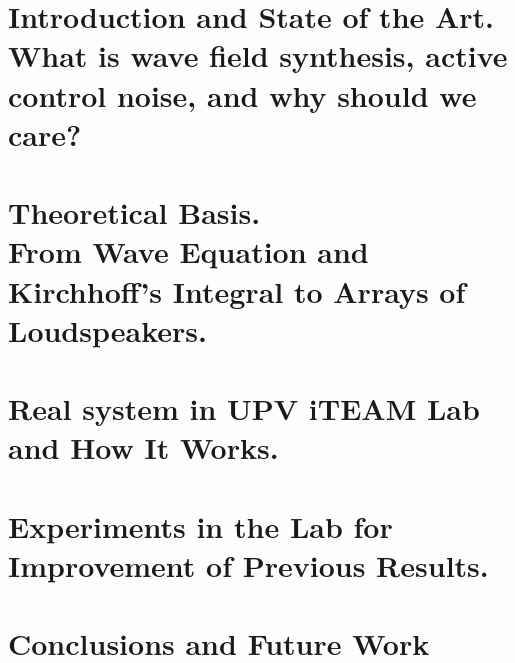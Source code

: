 \documentclass[10pt]{report}
\begin{document}
\chapter[Introduction and State of the Art]{Introduction and State of the Art.\\What is wave field synthesis, active control noise, and why should we care?}


\chapter[Theoretical Basis]{Theoretical Basis.\\From Wave Equation and Kirchhoff's Integral to Arrays of Loudspeakers.}



\chapter{Real system in UPV iTEAM Lab and How It Works.}




\chapter{Experiments in the Lab for Improvement of Previous Results.}

\chapter{Conclusions and Future Work}


\end{document}
